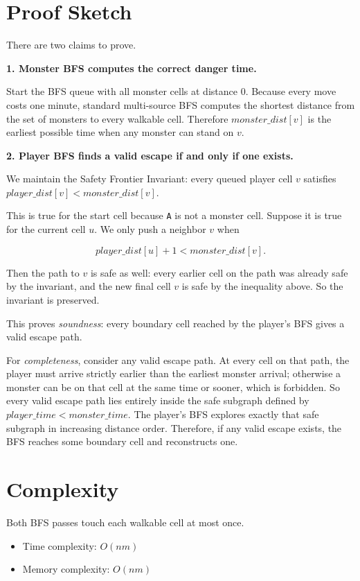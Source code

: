 \section{Proof Sketch}

There are two claims to prove.

\textbf{1. Monster BFS computes the correct danger time.}

Start the BFS queue with all monster cells at distance $0$. Because every move
costs one minute, standard multi-source BFS computes the shortest distance from
the set of monsters to every walkable cell. Therefore $monster\_dist[v]$ is the
earliest possible time when any monster can stand on $v$.

\textbf{2. Player BFS finds a valid escape if and only if one exists.}

We maintain the Safety Frontier Invariant:
every queued player cell $v$ satisfies
$player\_dist[v] < monster\_dist[v]$.

This is true for the start cell because \texttt{A} is not a monster cell.
Suppose it is true for the current cell $u$. We only push a neighbor $v$ when

$$
player\_dist[u] + 1 < monster\_dist[v].
$$

Then the path to $v$ is safe as well: every earlier cell on the path was already
safe by the invariant, and the new final cell $v$ is safe by the inequality
above. So the invariant is preserved.

This proves \textit{soundness}: every boundary cell reached by the player's BFS
gives a valid escape path.

For \textit{completeness}, consider any valid escape path. At every cell on that
path, the player must arrive strictly earlier than the earliest monster arrival;
otherwise a monster can be on that cell at the same time or sooner, which is
forbidden. So every valid escape path lies entirely inside the safe subgraph
defined by $player\_time < monster\_time$. The player's BFS explores exactly
that safe subgraph in increasing distance order. Therefore, if any valid escape
exists, the BFS reaches some boundary cell and reconstructs one.

\section{Complexity}

Both BFS passes touch each walkable cell at most once.

\begin{itemize}
\item Time complexity: $O(nm)$
\item Memory complexity: $O(nm)$
\end{itemize}

